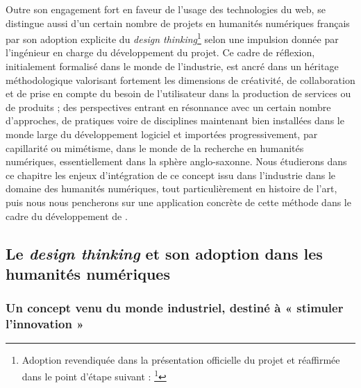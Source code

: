 Outre son engagement fort en faveur de l’usage des technologies du web, \pense se distingue aussi d’un certain nombre de projets en humanités numériques français par son adoption explicite du \textit{design thinking}\footnote{Adoption revendiquée dans la présentation officielle du projet et réaffirmée dans le point d’étape suivant : \footcite{carius_plateforme_2020}} selon une impulsion donnée par l’ingénieur en charge du développement du projet. Ce cadre de réflexion, initialement formalisé dans le monde de l’industrie, est ancré dans un héritage méthodologique valorisant fortement les dimensions de créativité, de collaboration et de prise en compte du besoin de l’utilisateur dans la production de services ou de produits ; des perspectives entrant en résonnance avec un certain nombre d’approches, de pratiques voire de disciplines maintenant bien installées dans le monde large du développement logiciel et importées progressivement, par capillarité ou mimétisme, dans le monde de la recherche en humanités numériques, essentiellement dans la sphère anglo-saxonne. Nous étudierons dans ce chapitre les enjeux d’intégration de ce concept issu dans l’industrie dans le domaine des humanités numériques, tout particulièrement en histoire de l’art, puis nous nous pencherons sur une application concrète de cette méthode dans le cadre du développement de \pense. 

\subsection{Le \textit{design thinking} et son adoption dans les humanités numériques}

\subsubsection{Un concept venu du monde industriel, destiné à « stimuler l’innovation »}


